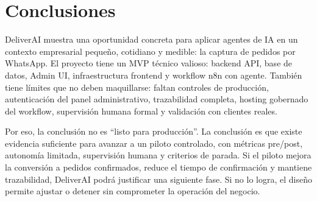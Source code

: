 \section{Conclusiones}

DeliverAI muestra una oportunidad concreta para aplicar agentes de IA en un contexto empresarial pequeño, cotidiano y medible: la captura de pedidos por WhatsApp. El proyecto tiene un MVP técnico valioso: backend API, base de datos, Admin UI, infraestructura frontend y workflow n8n con agente. También tiene límites que no deben maquillarse: faltan controles de producción, autenticación del panel administrativo, trazabilidad completa, hosting gobernado del workflow, supervisión humana formal y validación con clientes reales.

Por eso, la conclusión no es ``listo para producción''. La conclusión es que existe evidencia suficiente para avanzar a un piloto controlado, con métricas pre/post, autonomía limitada, supervisión humana y criterios de parada. Si el piloto mejora la conversión a pedidos confirmados, reduce el tiempo de confirmación y mantiene trazabilidad, DeliverAI podrá justificar una siguiente fase. Si no lo logra, el diseño permite ajustar o detener sin comprometer la operación del negocio.
